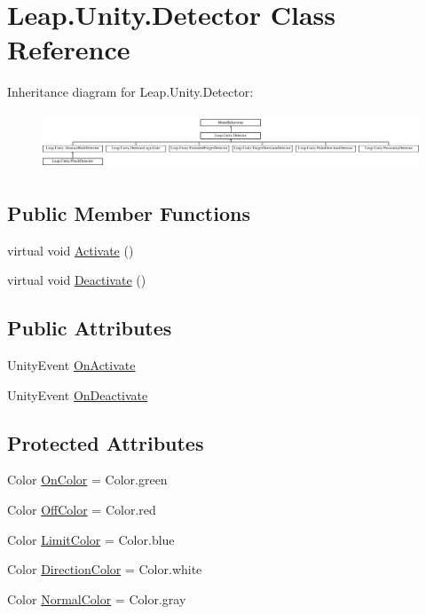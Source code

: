 \hypertarget{class_leap_1_1_unity_1_1_detector}{}\section{Leap.\+Unity.\+Detector Class Reference}
\label{class_leap_1_1_unity_1_1_detector}
Inheritance diagram for Leap.\+Unity.\+Detector\+:\begin{figure}[H]
\begin{center}
\leavevmode
\includegraphics[height=1.689291cm]{class_leap_1_1_unity_1_1_detector}
\end{center}
\end{figure}
\subsection*{Public Member Functions}
\begin{DoxyCompactItemize}
\item 
virtual void \mbox{\hyperlink{class_leap_1_1_unity_1_1_detector_aed8730358778949381639d53df61aac8}{Activate}} ()
\item 
virtual void \mbox{\hyperlink{class_leap_1_1_unity_1_1_detector_a6493874fd22793d7b59dc56098559d59}{Deactivate}} ()
\end{DoxyCompactItemize}
\subsection*{Public Attributes}
\begin{DoxyCompactItemize}
\item 
Unity\+Event \mbox{\hyperlink{class_leap_1_1_unity_1_1_detector_a55b5828df6cfa7321ccbf04dcf027ff9}{On\+Activate}}
\item 
Unity\+Event \mbox{\hyperlink{class_leap_1_1_unity_1_1_detector_a786623564f0d001aa6869bb136786822}{On\+Deactivate}}
\end{DoxyCompactItemize}
\subsection*{Protected Attributes}
\begin{DoxyCompactItemize}
\item 
Color \mbox{\hyperlink{class_leap_1_1_unity_1_1_detector_ad922f873e3c07f9128d6438332e7b9c7}{On\+Color}} = Color.\+green
\item 
Color \mbox{\hyperlink{class_leap_1_1_unity_1_1_detector_a976fc8d66dd98aaea15196d861df429c}{Off\+Color}} = Color.\+red
\item 
Color \mbox{\hyperlink{class_leap_1_1_unity_1_1_detector_ad7f8d0e7b913b78e86b2dacaa56287aa}{Limit\+Color}} = Color.\+blue
\item 
Color \mbox{\hyperlink{class_leap_1_1_unity_1_1_detector_aae0718ccceffd88a12d63ad718cda346}{Direction\+Color}} = Color.\+white
\item 
Color \mbox{\hyperlink{class_leap_1_1_unity_1_1_detector_a2dc0788829955e7d50bc7d553cc68d05}{Normal\+Color}} = Color.\+gray
\end{DoxyCompactItemize}
